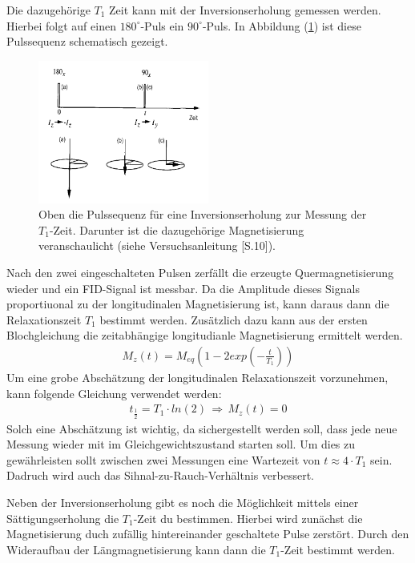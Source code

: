 Die dazugeh\"{o}rige $T_1$ Zeit kann mit der Inversionserholung gemessen werden.
Hierbei folgt auf einen $180^{\circ}$-Puls ein $90^{\circ}$-Puls.
In Abbildung (\ref{inversion}) ist diese Pulssequenz schematisch gezeigt.
\begin{figure}
	\centering
	\includegraphics[width=0.5\textwidth]{Plots/inversionserholung.png}
	\caption{Oben die Pulssequenz f\"{u}r eine Inversionserholung zur Messung der $T_1$-Zeit. Darunter ist die dazugeh\"{o}rige Magnetisierung veranschaulicht (siehe Versuchsanleitung \cite{Anleitung}[S.10]).}
	\label{inversion}
\end{figure}
Nach den zwei eingeschalteten Pulsen zerf\"{a}llt die erzeugte Quer{\-}mag{\-}ne{\-}ti{\-}sie{\-}rung wieder und ein FID-Signal ist messbar.
Da die Amplitude dieses Signals proportiuonal zu der longitudinalen Magnetisierung ist, kann daraus dann die Relaxationszeit $T_1$ bestimmt werden.
Zus\"{a}tzlich dazu kann aus der ersten Blochgleichung die zeitabh\"{a}ngige longitudianle Magnetisierung ermittelt werden.
\begin{align*}
	M_z(t) = M_{eq} \left(1 - 2 exp\left( - \frac{t}{T_1} \right) \right)
\end{align*}
Um eine grobe Absch\"{a}tzung der longitudinalen Relaxationszeit vorzunehmen, kann folgende Gleichung verwendet werden:
\begin{align*}
	t_{\frac{1}{2}} = T_1 \cdot ln(2) \, \Rightarrow \, M_z(t) = 0
\end{align*}
Solch eine Absch\"{a}tzung ist wichtig, da sichergestellt werden soll, dass jede neue Messung wieder mit im Gleichgewichtszustand starten soll.
Um dies zu gew\"{a}hrleisten sollt zwischen zwei Messungen eine Wartezeit von $t \approx 4 \cdot T_1$ sein.
Dadruch wird auch das Sihnal-zu-Rauch-Verh\"{a}ltnis verbessert.

Neben der Inversionserholung gibt es noch die M\"{o}glichkeit mittels einer S\"{a}ttigungs{\-}erhol{\-}ung die $T_1$-Zeit du bestimmen.
Hierbei wird zun\"{a}chst die Magnetisierung duch zuf\"{a}llig hintereinander geschaltete Pulse zerst\"{o}rt.
Durch den Wideraufbau der L\"{a}ngmagnetisierung kann dann die $T_1$-Zeit bestimmt werden.

